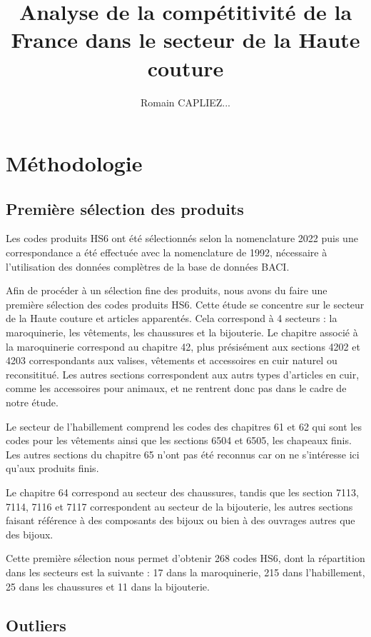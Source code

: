 \documentclass[french,10pt,a4paper]{article}
\title{Analyse de la compétitivité de la France dans le secteur de la Haute couture}
\author{Romain CAPLIEZ...}
\begin{document}
\maketitle

\section{Méthodologie}

\subsection{Première sélection des produits}

Les codes produits HS6 ont été sélectionnés selon la nomenclature 2022 puis une correspondance a été effectuée avec la nomenclature de 1992, nécessaire à l'utilisation des données complètres de la base de données BACI.

Afin de procéder à un sélection fine des produits, nous avons du faire une première sélection des codes produits HS6. Cette étude se concentre sur le secteur de la Haute couture et articles apparentés. Cela correspond à 4 secteurs : la maroquinerie, les vêtements, les chaussures et la bijouterie. Le chapitre associé à la maroquinerie correspond au chapitre 42, plus présisément aux sections 4202 et 4203 correspondants aux valises, vêtements et accessoires en cuir naturel ou reconsititué. Les autres sections correspondent aux autrs types d'articles en cuir, comme les accessoires pour animaux, et ne rentrent donc pas dans le cadre de notre étude.

Le secteur de l'habillement comprend les codes des chapitres 61 et 62 qui sont les codes pour les vêtements ainsi que les sections 6504 et 6505, les chapeaux finis. Les autres sections du chapitre 65 n'ont pas été reconnus car on ne s'intéresse ici qu'aux produits finis.

Le chapitre 64 correspond au secteur des chaussures, tandis que les section 7113, 7114, 7116 et 7117 correspondent au secteur de la bijouterie, les autres sections faisant référence à des composants des bijoux ou bien à des ouvrages autres que des bijoux.

Cette première sélection nous permet d'obtenir 268 codes HS6, dont la répartition dans les secteurs est la suivante : 17 dans la maroquinerie, 215 dans l'habillement, 25 dans les chaussures et 11 dans la bijouterie. 

\subsection{Outliers}
\end{document}
